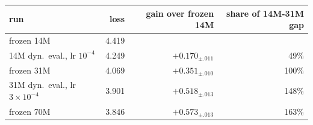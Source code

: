 \begin{tabular}{lrrr}
\toprule
run & loss & gain over frozen 14M & share of 14M-31M gap \\
\midrule
frozen 14M & 4.419 &  &  \\
14M dyn.\ eval., lr $10^{-4}$ & 4.249 & $+0.170_{\pm .011}$ & 49\% \\
frozen 31M & 4.069 & $+0.351_{\pm .010}$ & 100\% \\
31M dyn.\ eval., lr $3\!\times\!10^{-4}$ & 3.901 & $+0.518_{\pm .013}$ & 148\% \\
frozen 70M & 3.846 & $+0.573_{\pm .013}$ & 163\% \\
\bottomrule
\end{tabular}
